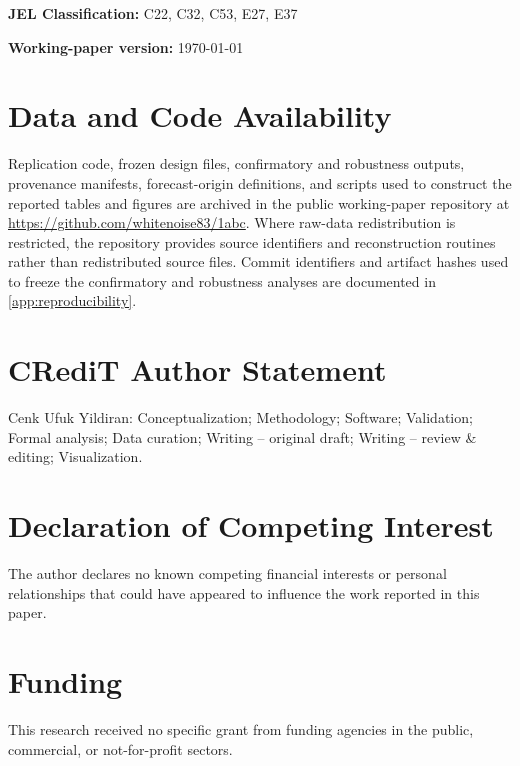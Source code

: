 \documentclass[preprint,12pt,authoryear]{elsarticle}
\begin{document}
\noindent\textbf{JEL Classification:} C22, C32, C53, E27, E37

\vspace{0.5em}
\noindent\textbf{Working-paper version:} \today











\section*{Data and Code Availability}
\label{sec:data_code}
Replication code, frozen design files, confirmatory and robustness outputs,
provenance manifests, forecast-origin definitions, and scripts used to construct
the reported tables and figures are archived in the public working-paper
repository at \url{https://github.com/whitenoise83/1abc}. Where raw-data
redistribution is restricted, the repository provides source identifiers and
reconstruction routines rather than redistributed source files. Commit
identifiers and artifact hashes used to freeze the confirmatory and robustness
analyses are documented in \ref{app:reproducibility}.

\section*{CRediT Author Statement}
Cenk Ufuk Yildiran: Conceptualization; Methodology; Software; Validation; Formal analysis; Data curation; Writing -- original draft; Writing -- review \& editing; Visualization.

\section*{Declaration of Competing Interest}
The author declares no known competing financial interests or personal relationships that could have appeared to influence the work reported in this paper.

\section*{Funding}
This research received no specific grant from funding agencies in the public, commercial, or not-for-profit sectors.
\end{document}
